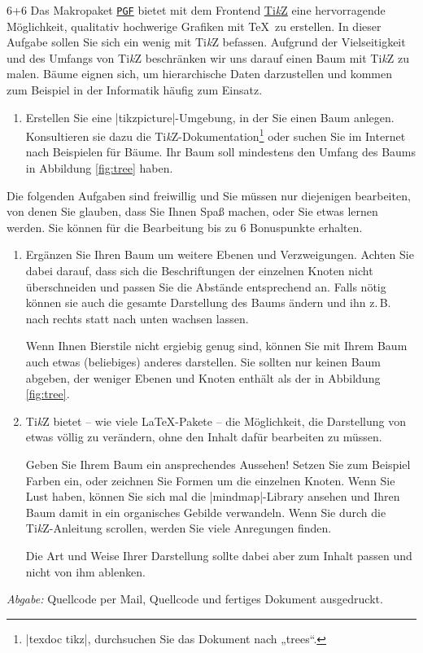 \documentclass{scrartcl}
\newcommand{\abgabe}[1]{\par\noindent\textit{Abgabe:} #1}
\newcommand{\pkg}[1]{\href{http://ctan.org/pkg/#1}{\texttt{#1}}}
\newcommand{\TikZ}{Ti\textit{k}Z\xspace}
\begin{document}
\begin{question}[subtitle=Baum mit \TikZ]{6+6}
	Das Makropaket \pkg{PGF} bietet mit dem Frontend \href{htp://ctan.org/pkg/tikz}{\TikZ} eine hervorragende Möglichkeit, qualitativ hochwerige Grafiken mit \TeX\ zu erstellen. In dieser Aufgabe sollen Sie sich ein wenig mit \TikZ befassen. Aufgrund der Vielseitigkeit und des Umfangs von \TikZ beschränken wir uns darauf einen Baum mit \TikZ zu malen. Bäume eignen sich, um hierarchische Daten darzustellen und kommen zum Beispiel in der Informatik häufig zum Einsatz.

	\begin{enumerate}[label=\alph*)]
		\item Erstellen Sie eine |tikzpicture|-Umgebung, in der Sie einen Baum anlegen. Konsultieren sie dazu die \TikZ-Dokumentation\footnote{|texdoc tikz|, durchsuchen Sie das Dokument nach „trees“.} oder suchen Sie im Internet nach Beispielen für Bäume. Ihr Baum soll mindestens den Umfang des Baums in Abbildung \ref{fig:tree} haben.
	\end{enumerate}
	Die folgenden Aufgaben sind freiwillig und Sie müssen nur diejenigen bearbeiten, von denen Sie glauben, dass Sie Ihnen Spaß machen, oder Sie etwas lernen werden. Sie können für die Bearbeitung bis zu 6 Bonuspunkte erhalten.
	\begin{enumerate}[resume, label=\alph*)]
		\item Ergänzen Sie Ihren Baum um weitere Ebenen und Verzweigungen. Achten Sie dabei darauf, dass sich die Beschriftungen der einzelnen Knoten nicht überschneiden und passen Sie die Abstände entsprechend an. Falls nötig können sie auch die gesamte Darstellung des Baums ändern und ihn z.\,B. nach rechts statt nach unten wachsen lassen.
		
		Wenn Ihnen Bierstile nicht ergiebig genug sind, können Sie mit Ihrem Baum auch etwas (beliebiges) anderes darstellen. Sie sollten nur keinen Baum abgeben, der weniger Ebenen und Knoten enthält als der in Abbildung \ref{fig:tree}.
		
		\item \TikZ bietet – wie viele \LaTeX-Pakete – die Möglichkeit, die Darstellung von etwas völlig zu verändern, ohne den Inhalt dafür bearbeiten zu müssen.
		
		Geben Sie Ihrem Baum ein ansprechendes Aussehen! Setzen Sie zum Beispiel Farben ein, oder zeichnen Sie Formen um die einzelnen Knoten. Wenn Sie Lust haben, können Sie sich mal die |mindmap|-Library ansehen und Ihren Baum damit in ein organisches Gebilde verwandeln. Wenn Sie durch die \TikZ-Anleitung scrollen, werden Sie viele Anregungen finden.
		
		Die Art und Weise Ihrer Darstellung sollte dabei aber zum Inhalt passen und nicht von ihm ablenken.
	\end{enumerate}

	\abgabe{Quellcode per Mail{,} Quellcode und fertiges Dokument ausgedruckt.}
\end{question}
\end{document}

